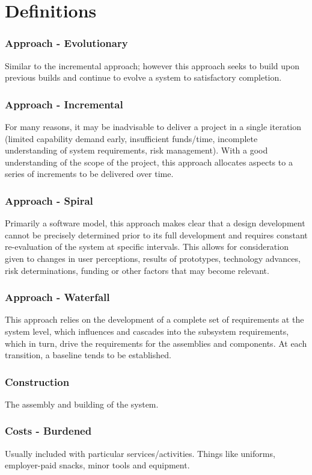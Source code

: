 \documentclass[journal]{IEEEtran}
\begin{document}
\clearpage
\section{Definitions}
\subsubsection{Approach - Evolutionary}
Similar to the incremental approach; however this approach seeks to build upon previous builds and continue to evolve a system to satisfactory completion.
\subsubsection{Approach - Incremental}
For many reasons, it may be inadvisable to deliver a project in a single iteration (limited capability demand early, insufficient funds/time, incomplete understanding of system requirements, risk management). With a good understanding of the scope of the project, this approach allocates aspects to a series of increments to be delivered over time.
\subsubsection{Approach - Spiral}
Primarily a software model, this approach makes clear that a design development cannot be precisely determined prior to its full development and requires constant re-evaluation of the system at specific intervals. This allows for consideration given to changes in user perceptions, results of prototypes, technology advances, risk determinations, funding or other factors that may become relevant.
\subsubsection{Approach - Waterfall}
This approach relies on the development of a complete set of requirements at the system level, which influences and cascades into the subsystem requirements, which in turn, drive the requirements for the assemblies and components. At each transition, a baseline tends to be established.
\subsubsection{Construction}
The assembly and building of the system.
\subsubsection{Costs - Burdened}
Usually included with particular services/activities. Things like uniforms, employer-paid snacks, minor tools and equipment.
\end{document}
